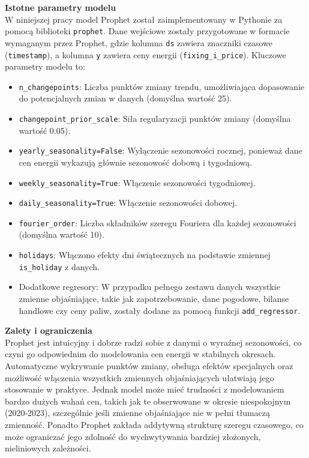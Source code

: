 \textbf{Istotne parametry modelu} \\
W niniejszej pracy model Prophet został zaimplementowany w Pythonie za pomocą biblioteki \texttt{prophet}. Dane wejściowe zostały przygotowane w formacie wymaganym przez Prophet, gdzie kolumna \texttt{ds} zawiera znaczniki czasowe (\texttt{timestamp}), a kolumna \texttt{y} zawiera ceny energii (\texttt{fixing\_i\_price}). Kluczowe parametry modelu to:
\begin{itemize}
    \item \texttt{n\_changepoints}: Liczba punktów zmiany trendu, umożliwiająca dopasowanie do potencjalnych zmian w danych (domyślna wartość 25).
    \item \texttt{changepoint\_prior\_scale}: Siła regularyzacji punktów zmiany (domyślna wartość 0.05).
    \item \texttt{yearly\_seasonality=False}: Wyłączenie sezonowości rocznej, ponieważ dane cen energii wykazują głównie sezonowość dobową i tygodniową.
    \item \texttt{weekly\_seasonality=True}: Włączenie sezonowości tygodniowej.
    \item \texttt{daily\_seasonality=True}: Włączenie sezonowości dobowej.
    \item \texttt{fourier\_order}: Liczba składników szeregu Fouriera dla każdej sezonowości (domyślna wartość 10).
    \item \texttt{holidays}: Włączono efekty dni świątecznych na podstawie zmiennej \texttt{is\_holiday} z danych.
    \item Dodatkowe regresory: W przypadku pełnego zestawu danych wszystkie zmienne objaśniające, takie jak zapotrzebowanie, dane pogodowe, bilanse handlowe czy ceny paliw, zostały dodane za pomocą funkcji \texttt{add\_regressor}.
\end{itemize}

\textbf{Zalety i ograniczenia} \\
Prophet jest intuicyjny i dobrze radzi sobie z danymi o wyraźnej sezonowości, co czyni go odpowiednim do modelowania cen energii w stabilnych okresach. Automatyczne wykrywanie punktów zmiany, obsługa efektów specjalnych oraz możliwość włączenia wszystkich zmiennych objaśniających ułatwiają jego stosowanie w praktyce. Jednak model może mieć trudności z modelowaniem bardzo dużych wahań cen, takich jak te obserwowane w okresie niespokojnym (2020-2023), szczególnie jeśli zmienne objaśniające nie w pełni tłumaczą zmienność. Ponadto Prophet zakłada addytywną strukturę szeregu czasowego, co może ograniczać jego zdolność do wychwytywania bardziej złożonych, nieliniowych zależności.

